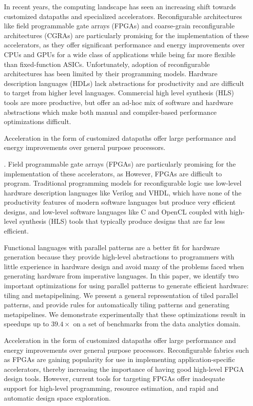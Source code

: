 In recent years, the computing landscape has seen an increasing shift towards customized datapaths and specialized accelerators. Reconfigurable architectures like field programmable gate arrays (FPGAs) and coarse-grain reconfigurable architectures (CGRAs) are particularly promising for the implementation of these accelerators, as they offer significant performance and energy improvements over CPUs and GPUs for a wide class of applications while being far more flexible than fixed-function ASICs. Unfortunately, adoption of reconfigurable architectures has been limited by their programming models. Hardware description languages (HDLs) lack abstractions for productivity and are difficult to target from higher level languages. Commercial high level synthesis (HLS) tools are more productive, but offer an ad-hoc mix of software and hardware abstractions which make both manual and compiler-based performance optimizations difficult.


Acceleration in the form of customized datapaths offer large
performance and energy improvements over general purpose
processors.



. Field programmable gate arrays (FPGAs) are particularly promising for the implementation of these accelerators, as  However, FPGAs are difficult to program. Traditional programming models for reconfigurable logic use low-level hardware description languages like Verilog and VHDL, which have none of the productivity features of modern software languages but produce very efficient designs, and low-level software languages like C and OpenCL coupled with high-level synthesis (HLS) tools that typically produce designs that are far less efficient.

Functional languages with parallel patterns are a better fit for hardware generation because they provide high-level abstractions
to programmers with little experience in hardware design and avoid many of the problems faced when generating hardware from imperative languages.  In this paper, we identify two important optimizations for using parallel patterns to generate efficient hardware:
tiling and metapipelining.  We present a general representation of tiled parallel patterns, and provide rules for
automatically tiling patterns and generating metapipelines.
We demonstrate experimentally that these optimizations result in speedups up to
$39.4 \times$ on a set of benchmarks from the data analytics domain.

Acceleration in the form of customized datapaths offer large
performance and energy improvements over general purpose
processors. Reconfigurable fabrics such as FPGAs are gaining
popularity for use in implementing application-specific accelerators, thereby
increasing the importance of having good high-level FPGA design
tools. However, current tools for targeting FPGAs offer inadequate
support for high-level programming, resource estimation,
and rapid and automatic design space exploration.

